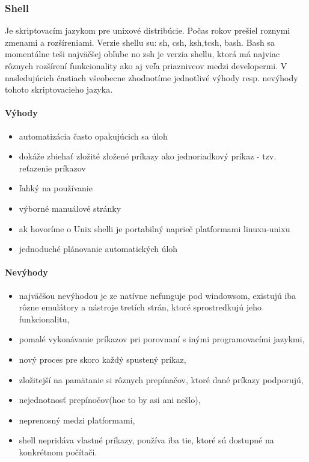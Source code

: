 \subsubsection{Shell}
\indent
Je skriptovacím jazykom pre unixové distribúcie. Počas rokov prešiel roznymi zmenami a rozšíreniami. Verzie shellu su: sh, csh, ksh,tcsh, bash. Bash sa momentálne teši najväčšej obľube no zsh je verzia shellu, ktorá má najviac rôznych rozšírení funkcionality ako aj veľa priaznivcov medzi developermi. V nasledujúcich častiach všeobecne zhodnotíme jednotlivé výhody resp. nevýhody tohoto skriptovacieho jazyka.

\paragraph{Výhody}
\begin{itemize}
	\item automatizácia často opakujúcich sa úloh
	\item dokáže zbiehať zložité zložené príkazy ako jednoriadkový príkaz  - tzv. reťazenie príkazov
	\item ľahký na používanie
	\item výborné manuálové stránky
	\item ak hovoríme o Unix shelli je portabilný naprieč platformami linuxu-unixu
	\item jednoduché plánovanie automatických úloh
	\newline
\end{itemize}
\paragraph{Nevýhody}
\begin{itemize}
	\item najväčšou nevýhodou je ze natívne nefunguje pod windowsom, existujú iba rôzne emulátory a nástroje tretích strán, ktoré sprostredkujú jeho funkcionalitu,
	\item pomalé vykonávanie príkazov pri porovnaní s inými programovacími jazykmi,
	\item nový proces pre skoro každý spustený príkaz,
	\item zložitejší na pamätanie si rôznych prepínačov, ktoré dané príkazy podporujú,
	\item nejednotnosť prepínočov(hoc to by asi ani nešlo),
	\item neprenosný medzi platformami,
	\item shell nepridáva vlastné príkazy, používa iba tie, ktoré sú dostupné na konkrétnom počítači.
\end{itemize}
